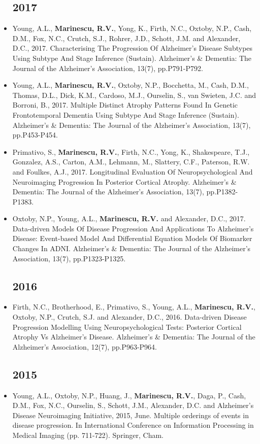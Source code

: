 \documentclass[a4paper,10pt]{article} %
\begin{document}
\begin{itemize}
\subsection*{2017}
\item[\poster] Young, A.L., \textbf{Marinescu, R.V.}, Yong, K., Firth, N.C., Oxtoby, N.P., Cash, D.M., Fox, N.C., Crutch, S.J., Rohrer, J.D., Schott, J.M. and Alexander, D.C., 2017. Characterising The Progression Of Alzheimer’s Disease Subtypes Using Subtype And Stage Inference (Sustain). Alzheimer's \& Dementia: The Journal of the Alzheimer's Association, 13(7), pp.P791-P792.
\item[\poster] Young, A.L., \textbf{Marinescu, R.V.}, Oxtoby, N.P., Bocchetta, M., Cash, D.M., Thomas, D.L., Dick, K.M., Cardoso, M.J., Ourselin, S., van Swieten, J.C. and Borroni, B., 2017. Multiple Distinct Atrophy Patterns Found In Genetic Frontotemporal Dementia Using Subtype And Stage Inference (Sustain). Alzheimer's \& Dementia: The Journal of the Alzheimer's Association, 13(7), pp.P453-P454.
\item[\poster] Primativo, S., \textbf{Marinescu, R.V.}, Firth, N.C., Yong, K., Shakespeare, T.J., Gonzalez, A.S., Carton, A.M., Lehmann, M., Slattery, C.F., Paterson, R.W. and Foulkes, A.J., 2017. Longitudinal Evaluation Of Neuropsychological And Neuroimaging Progression In Posterior Cortical Atrophy. Alzheimer's \& Dementia: The Journal of the Alzheimer's Association, 13(7), pp.P1382-P1383.
\item[\poster] Oxtoby, N.P., Young, A.L., \textbf{Marinescu, R.V.} and Alexander, D.C., 2017. Data-driven Models Of Disease Progression And Applications To Alzheimer’s Disease: Event-based Model And Differential Equation Models Of Biomarker Changes In ADNI. Alzheimer's \& Dementia: The Journal of the Alzheimer's Association, 13(7), pp.P1323-P1325.

\subsection*{2016}
\item[\poster] Firth, N.C., Brotherhood, E., Primativo, S., Young, A.L., \textbf{Marinescu, R.V.}, Oxtoby, N.P., Crutch, S.J. and Alexander, D.C., 2016. Data-driven Disease Progression Modelling Using Neuropsychological Tests: Posterior Cortical Atrophy Vs Alzheimer's Disease. Alzheimer's \& Dementia: The Journal of the Alzheimer's Association, 12(7), pp.P963-P964.

\subsection*{2015}
\item[\poster] Young, A.L., Oxtoby, N.P., Huang, J., \textbf{Marinescu, R.V.}, Daga, P., Cash, D.M., Fox, N.C., Ourselin, S., Schott, J.M., Alexander, D.C. and Alzheimer's Disease Neuroimaging Initiative, 2015, June. Multiple orderings of events in disease progression. In International Conference on Information Processing in Medical Imaging (pp. 711-722). Springer, Cham.

\end{itemize}
\end{document}
